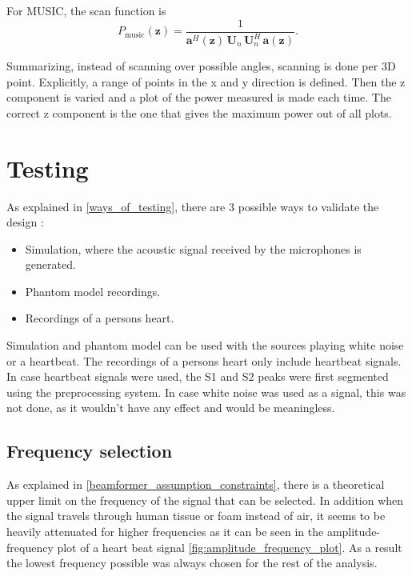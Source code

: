 For MUSIC, the scan function is
\begin{equation}
P_{\mathrm{music}}(\mathbf{z})
= \frac{1}{\mathbf{a}^H(\mathbf{z})\, \mathbf{U}_n\, \mathbf{U}_n^{H}\, \mathbf{a}(\mathbf{z})}.
\label{eq:Pmusic}
\end{equation}

Summarizing, instead of scanning over possible angles, scanning is done per 3D point.
Explicitly, a range of points in the x and y direction is defined. Then the z component is varied and a plot of the power measured is made each time. The correct z component is the one that gives the maximum power out of all plots.
\label{depth_analysis}

\section{Testing}
As explained in \ref{ways_of_testing}, there are 3 possible ways to validate the design :
\begin{itemize}
    \item Simulation, where the acoustic signal received by the microphones is generated.
    \item Phantom model recordings. 
    \item Recordings of a persons heart.
\end{itemize}
Simulation and phantom model can be used with the sources playing white noise or a heartbeat. The recordings of a persons heart only include heartbeat signals. In case heartbeat signals were used, the S1 and S2 peaks were first segmented using the preprocessing system. In case white noise was used as a signal, this was not done, as it wouldn't have any effect and would be meaningless.

\subsection{Frequency selection}
As explained in \ref{beamformer_assumption_constraints}, there is a theoretical upper limit on the frequency of the signal that can be selected. In addition when the signal travels through human tissue or foam instead of air, it seems to be heavily attenuated for higher frequencies as it can be seen in the amplitude-frequency plot of a heart beat signal \ref{fig:amplitude_frequency_plot}. As a result the lowest frequency possible was always chosen for the rest of the analysis.

